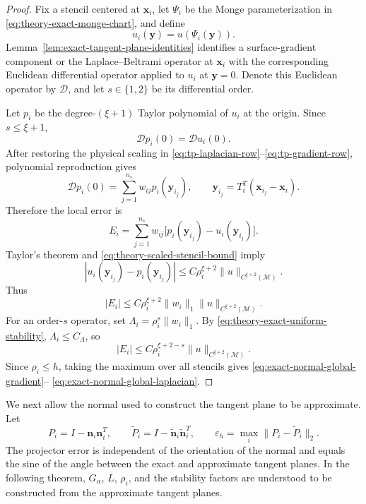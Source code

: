 \documentclass[a4paper,fleqn]{cas-sc}
\begin{document}
\begin{proof}
Fix a stencil centered at \(\bm x_i\), let \(\Psi_i\) be the Monge
parameterization in \eqref{eq:theory-exact-monge-chart}, and define
\[
  u_i(\bm y)=u(\Psi_i(\bm y)).
\]
Lemma~\ref{lem:exact-tangent-plane-identities} identifies a surface-gradient
component or the Laplace--Beltrami operator at \(\bm x_i\) with the
corresponding Euclidean differential operator applied to \(u_i\) at
\(\bm y=0\).  Denote this Euclidean operator by \(\mathcal D\), and let
\(s\in\{1,2\}\) be its differential order.

Let \(p_i\) be the degree-\((\xi+1)\) Taylor polynomial of \(u_i\) at the
origin.  Since \(s\leq\xi+1\),
\[
  \mathcal D p_i(0)=\mathcal D u_i(0).
\]
After restoring the physical scaling in \eqref{eq:tp-laplacian-row}--\eqref{eq:tp-gradient-row}, polynomial
reproduction gives
\[
  \mathcal D p_i(0)
  =\sum_{j=1}^{n_s}w_{ij}p_i(\bm y_{i_j}),
  \qquad
  \bm y_{i_j}=T_i^T(\bm x_{i_j}-\bm x_i).
\]
Therefore the local error is
\[
  E_i
  =\sum_{j=1}^{n_s}w_{ij}
  \bigl[p_i(\bm y_{i_j})-u_i(\bm y_{i_j})\bigr].
\]
Taylor's theorem and \eqref{eq:theory-scaled-stencil-bound} imply
\[
  |u_i(\bm y_{i_j})-p_i(\bm y_{i_j})|
  \leq
  C\rho_i^{\xi+2}\|u\|_{C^{\xi+2}(\mathcal M)}.
\]
Thus 
\[
  |E_i|
  \leq
  C\rho_i^{\xi+2}\|w_i\|_1
  \|u\|_{C^{\xi+2}(\mathcal M)}.
\]
For an order-\(s\) operator, set
\(\Lambda_i=\rho_i^s\|w_i\|_1\).  By
\eqref{eq:theory-exact-uniform-stability}, \(\Lambda_i\leq C_\Lambda\), so
\[
  |E_i|
  \leq
  C\rho_i^{\xi+2-s}\|u\|_{C^{\xi+2}(\mathcal M)}.
\]
Since \(\rho_i\leq h\), taking the maximum over all stencils gives
\eqref{eq:exact-normal-global-gradient}--
\eqref{eq:exact-normal-global-laplacian}.
\end{proof}

We next allow the normal used to construct the tangent plane to be
approximate.  Let
\begin{equation}
  P_i=I-\bm n_i\bm n_i^T,
  \qquad
  \widetilde P_i=I-\widetilde{\bm n}_i\widetilde{\bm n}_i^T,
  \qquad
  \varepsilon_h=\max_i\|P_i-\widetilde P_i\|_2.
  \label{eq:theory-projector-error}
\end{equation}
The projector error is independent of the orientation of the normal and equals
the sine of the angle between the exact and approximate tangent planes.
In the following theorem, \(G_\alpha\), \(L\), \(\rho_i\), and the stability
factors are understood to be constructed from the approximate tangent planes.
\end{document}
